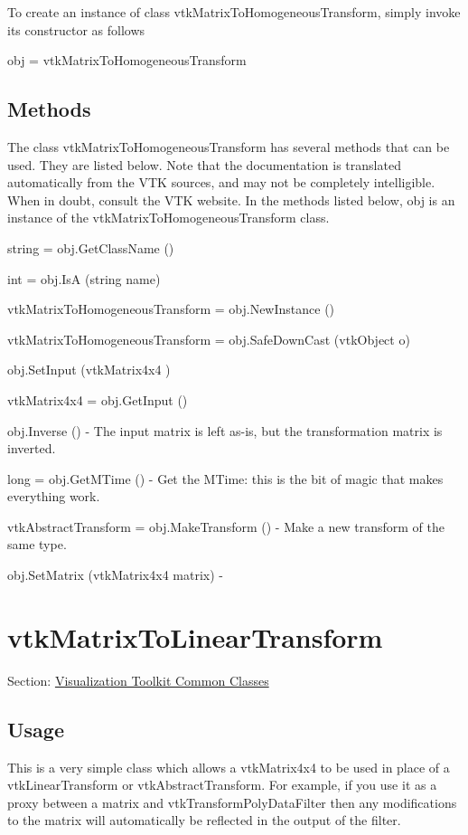 To create an instance of class vtk\-Matrix\-To\-Homogeneous\-Transform, simply invoke its constructor as follows \begin{DoxyVerb}  obj = vtkMatrixToHomogeneousTransform
\end{DoxyVerb}
 \hypertarget{vtkwidgets_vtkxyplotwidget_Methods}{}\subsection{Methods}\label{vtkwidgets_vtkxyplotwidget_Methods}
The class vtk\-Matrix\-To\-Homogeneous\-Transform has several methods that can be used. They are listed below. Note that the documentation is translated automatically from the V\-T\-K sources, and may not be completely intelligible. When in doubt, consult the V\-T\-K website. In the methods listed below, {\ttfamily obj} is an instance of the vtk\-Matrix\-To\-Homogeneous\-Transform class. 
\begin{DoxyItemize}
\item {\ttfamily string = obj.\-Get\-Class\-Name ()}  
\item {\ttfamily int = obj.\-Is\-A (string name)}  
\item {\ttfamily vtk\-Matrix\-To\-Homogeneous\-Transform = obj.\-New\-Instance ()}  
\item {\ttfamily vtk\-Matrix\-To\-Homogeneous\-Transform = obj.\-Safe\-Down\-Cast (vtk\-Object o)}  
\item {\ttfamily obj.\-Set\-Input (vtk\-Matrix4x4 )}  
\item {\ttfamily vtk\-Matrix4x4 = obj.\-Get\-Input ()}  
\item {\ttfamily obj.\-Inverse ()} -\/ The input matrix is left as-\/is, but the transformation matrix is inverted.  
\item {\ttfamily long = obj.\-Get\-M\-Time ()} -\/ Get the M\-Time\-: this is the bit of magic that makes everything work.  
\item {\ttfamily vtk\-Abstract\-Transform = obj.\-Make\-Transform ()} -\/ Make a new transform of the same type.  
\item {\ttfamily obj.\-Set\-Matrix (vtk\-Matrix4x4 matrix)} -\/  
\end{DoxyItemize}\hypertarget{vtkcommon_vtkmatrixtolineartransform}{}\section{vtk\-Matrix\-To\-Linear\-Transform}\label{vtkcommon_vtkmatrixtolineartransform}
Section\-: \hyperlink{sec_vtkcommon}{Visualization Toolkit Common Classes} \hypertarget{vtkwidgets_vtkxyplotwidget_Usage}{}\subsection{Usage}\label{vtkwidgets_vtkxyplotwidget_Usage}
This is a very simple class which allows a vtk\-Matrix4x4 to be used in place of a vtk\-Linear\-Transform or vtk\-Abstract\-Transform. For example, if you use it as a proxy between a matrix and vtk\-Transform\-Poly\-Data\-Filter then any modifications to the matrix will automatically be reflected in the output of the filter.

